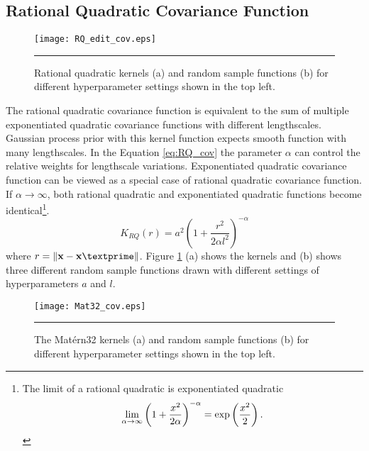 \subsection{Rational Quadratic Covariance Function}
\begin{figure}
	\centering
		\texttt{[image: RQ\_edit\_cov.eps]}
		\rule{35em}{0.5pt}
	\caption[Rational quadratic kernels and random sample functions]
		{Rational quadratic kernels (a) and random sample functions (b) for different hyperparameter settings shown in the top left.}
	\label{fig:Rational_Quadratic_covariance}
\end{figure}
The rational quadratic covariance function is equivalent to the sum of multiple exponentiated quadratic covariance functions with different lengthscales. Gaussian process prior with this kernel function expects smooth function with many lengthscales. In the Equation \ref{eq:RQ_cov} the parameter $\alpha$ can control the relative weights for lengthscale variations. Exponentiated quadratic covariance function can be viewed as a special case of rational quadratic covariance function. If $\alpha \to \infty$, both rational quadratic and exponentiated quadratic functions become identical\footnote{The limit of a rational quadratic is exponentiated quadratic $$\lim_{\alpha \to \infty} \left(1+\frac{x^2}{2\alpha}\right)^{-\alpha}=\exp\left(\-\frac{x^2}{2} \right).$$}.
\begin{equation} \label{eq:RQ_cov}
K_{RQ}(r)= a^2 \left(1+ \frac{r^2}{2 \alpha l^2}\right)^{-\alpha}
\end{equation}
where $r=\lVert \textbf{x}-\textbf{x}\textprime \rVert$. Figure \ref{fig:Rational_Quadratic_covariance} (a) shows the kernels and (b) shows three different random sample functions drawn with different settings of hyperparameters $a$ and $l$.
\begin{figure}[t]
	\centering
		\texttt{[image: Mat32\_cov.eps]}
		\rule{35em}{0.5pt}
	\caption[The Mat{\'e}rn32 kernels and random sample functions]
		{The Mat{\'e}rn32 kernels (a) and random sample functions (b) for different hyperparameter settings shown in the top left.}
	\label{fig:Matern32_covariance}
\end{figure}


